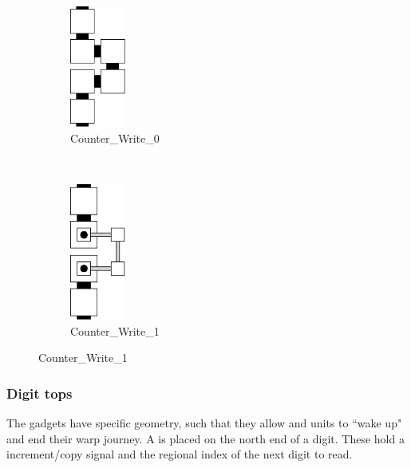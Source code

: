         \begin{figure}[H]
            \centering
            \begin{subfigure}[t]{0.2\textwidth}
                \centering
                \includegraphics[width=0.2\textwidth]{write/write_0}
                \caption{\label{fig:write/write_1} Counter\_Write\_0}
            \end{subfigure}%
            ~
            \begin{subfigure}[t]{0.2\textwidth}
                \centering
                \includegraphics[width=0.2\textwidth]{write/write_1}
                \caption{\label{fig:write/write_1} Counter\_Write\_1}
            \end{subfigure}%
        \end{figure}

    \subsubsection{Digit tops}
        The {\dtop} gadgets have specific geometry, such that they allow {\firstwarp} and
        {\secondwarp} units to ``wake up" and end their warp journey. A {\dtop} is placed on
        the north end of a digit. These hold a increment/copy signal and the regional index
        of the next digit to read.
        \vspace{1cm}

